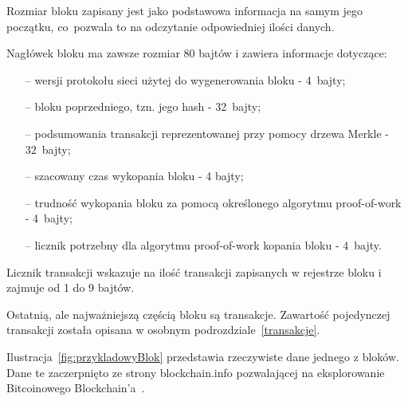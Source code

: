\documentclass[12pt, oneside, final, openany]{mgr}
\begin{document}
\indent Rozmiar bloku zapisany jest jako podstawowa informacja na samym jego początku, co~pozwala to na odczytanie odpowiedniej ilości danych. 

\indent Nagłówek bloku ma zawsze rozmiar 80 bajtów i zawiera informacje dotyczące:
\begin{itemize}
\item[--] wersji protokołu sieci użytej do wygenerowania bloku - 4~bajty;
\item[--] bloku poprzedniego, tzn. jego hash - 32~bajty;
\item[--] podsumowania transakcji reprezentowanej przy pomocy drzewa Merkle - 32~bajty;
\item[--] szacowany czas wykopania bloku - 4 bajty;
\item[--] trudność wykopania bloku za pomocą określonego algorytmu proof-of-work - 4~bajty;
\item[--] licznik potrzebny dla algorytmu proof-of-work kopania bloku - 4~bajty.
\end{itemize} 

\indent Licznik transakcji wskazuje na ilość transakcji zapisanych w rejestrze bloku i zajmuje od 1 do 9 bajtów.

\indent Ostatnią, ale najważniejszą częścią bloku są transakcje. Zawartość pojedynczej transakcji została opisana w osobnym podrozdziale~\ref{transakcje}.

\indent Ilustracja~\ref{fig:przykladowyBlok} przedstawia rzeczywiste dane jednego z bloków. Dane te zaczerpnięto ze strony blockchain.info pozwalającej na eksplorowanie Bitcoinowego Blockchain'a~\cite{blockchaininfo}.
\end{document}
